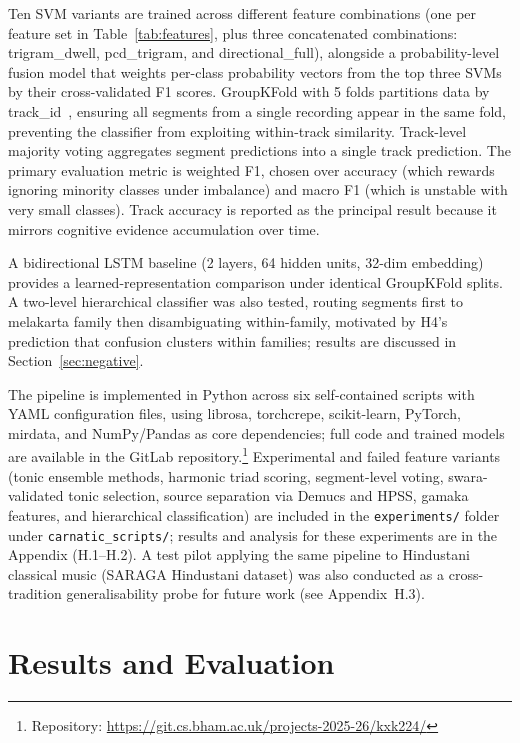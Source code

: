 \documentclass[11pt,a4paper]{article}
\begin{document}
{Ten SVM variants are trained across different feature combinations (one per feature set in Table~\ref{tab:features}, plus three concatenated combinations: trigram\_dwell, pcd\_trigram, and directional\_full), alongside a probability-level fusion model that weights per-class probability vectors from the top three SVMs by their cross-validated F1 scores. GroupKFold with 5 folds partitions data by track\_id~\cite{sturm2014}, ensuring all segments from a single recording appear in the same fold, preventing the classifier from exploiting within-track similarity. Track-level majority voting aggregates segment predictions into a single track prediction. The primary evaluation metric is weighted F1, chosen over accuracy (which rewards ignoring minority classes under imbalance) and macro F1 (which is unstable with very small classes). Track accuracy is reported as the principal result because it mirrors cognitive evidence accumulation over time.

A bidirectional LSTM baseline (2 layers, 64 hidden units, 32-dim embedding) provides a learned-representation comparison under identical GroupKFold splits. A two-level hierarchical classifier was also tested, routing segments first to melakarta family then disambiguating within-family, motivated by H4's prediction that confusion clusters within families; results are discussed in Section~\ref{sec:negative}.

The pipeline is implemented in Python across six self-contained scripts with YAML configuration files, using librosa, torchcrepe, scikit-learn, PyTorch, mirdata, and NumPy/Pandas as core dependencies; full code and trained models are available in the GitLab repository.\footnote{Repository: \href{https://git.cs.bham.ac.uk/projects-2025-26/kxk224/}{https://git.cs.bham.ac.uk/projects-2025-26/kxk224/}} Experimental and failed feature variants (tonic ensemble methods, harmonic triad scoring, segment-level voting, swara-validated tonic selection, source separation via Demucs and HPSS, gamaka features, and hierarchical classification) are included in the \texttt{experiments/} folder under \texttt{carnatic\_scripts/}; results and analysis for these experiments are in the Appendix (H.1--H.2). A test pilot applying the same pipeline to Hindustani classical music (SARAGA Hindustani dataset) was also conducted as a cross-tradition generalisability probe for future work (see Appendix~H.3).

\section{Results and Evaluation}

}
\end{document}
